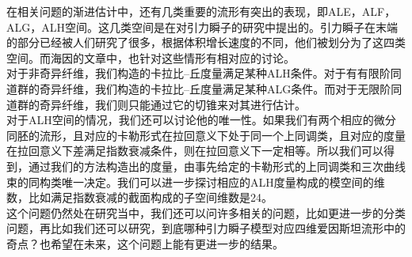 在相关问题的渐进估计中，还有几类重要的流形有突出的表现，即ALE，ALF，ALG，ALH空间。这几类空间是在对引力瞬子的研究中提出的。引力瞬子在末端的部分已经被人们研究了很多，根据体积增长速度的不同，他们被划分为了这四类空间。而海因的文章中，也针对这些情形有相对应的讨论。\\ \indent
对于非奇异纤维，我们构造的卡拉比--丘度量满足某种ALH条件。对于有有限阶同道群的奇异纤维，我们构造的卡拉比--丘度量满足某种ALG条件。而对于无限阶同道群的奇异纤维，我们则只能通过它的切锥来对其进行估计。\\ \indent
对于ALH空间的情况，我们还可以讨论他的唯一性。如果我们有两个相应的微分同胚的流形，且对应的卡勒形式在拉回意义下处于同一个上同调类，且对应的度量在拉回意义下差满足指数衰减条件，则在拉回意义下一定相等。所以我们可以得到，通过我们的方法构造出的度量，由事先给定的卡勒形式的上同调类和三次曲线束的同构类唯一决定。我们可以进一步探讨相应的ALH度量构成的模空间的维数，比如满足指数衰减的截面构成的子空间维数是24。\\ \indent
这个问题仍然处在研究当中，我们还可以问许多相关的问题，比如更进一步的分类问题，再比如我们还可以研究，到底哪种引力瞬子模型对应四维爱因斯坦流形中的奇点？也希望在未来，这个问题上能有更进一步的结果。
